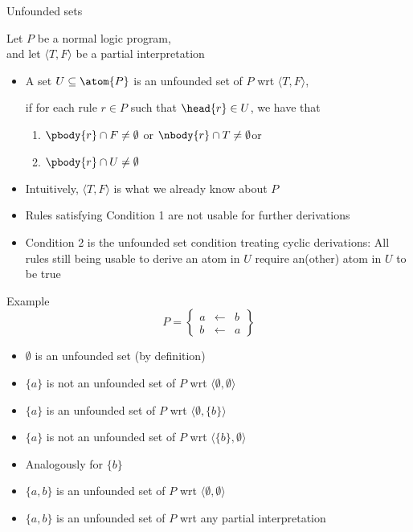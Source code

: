\begin{frame}{Unfounded sets}

  Let $P$ be a normal logic program,\\ and
  let $\langle T,F \rangle$ be a partial interpretation

  \begin{itemize}
  \item<2-> A set $U \subseteq \atom{P}$ is an \alert{unfounded set} of $P$
    wrt $\langle T,F \rangle$\pause[4],

    if for each rule $r\in P$ such that $\head{r}\in U$\pause[5], we have that

    \begin{enumerate}
    \item<6-> $\pbody{r} \cap F \neq \emptyset$ or $\nbody{r} \cap T \neq \emptyset$\pause[8] or
    \item<8-> $\pbody{r} \cap U \neq \emptyset$
    \end{enumerate}

  \item<3> Intuitively, $\langle T,F \rangle$ is what we already know about $P$
  \item<7> Rules satisfying Condition 1 are not usable for further derivations
  \item<9-> Condition 2 is the unfounded set condition treating cyclic derivations:
    \alert{All rules still being usable to derive an atom in $U$ require an(other) atom in $U$ to be true}
  \end{itemize}
\end{frame}
\begin{frame}{Example}
%
\[
P
=
\left\{
  \begin{array}{lcl}
    a &\leftarrow & b \\
    b &\leftarrow & a
  \end{array}
\right\}
\]
\begin{itemize}
\item<2-> $\emptyset$ is an unfounded set (by definition)
\smallskip
\item<3-> $\{a\}$ is not an unfounded set of $P$ wrt $\langle\emptyset,\emptyset\rangle$
\item<4-> $\{a\}$ is     an unfounded set of $P$ wrt $\langle\emptyset,\{b\}\rangle$
\item<5-> $\{a\}$ is not an unfounded set of $P$ wrt $\langle\{b\},\emptyset\rangle$
\smallskip
\item<6> Analogously for $\{b\}$
\smallskip
\item<7-> $\{a,b\}$ is     an unfounded set of $P$ wrt $\langle\emptyset,\emptyset\rangle$
\item<8-> $\{a,b\}$ is     an unfounded set of $P$ wrt any partial interpretation
\end{itemize}

\end{frame}
